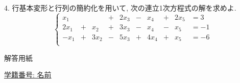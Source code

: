 \documentclass[dvipdfmx,a4paper,11pt]{article}
\theoremstyle{definition}
\begin{document}
4.
行基本変形と行列の簡約化を用いて, 次の連立1次方程式の解を求めよ.
 $$
 \left\{ 
\begin{matrix}
x_1& &         &  +& 2x_3&- &x_4&+ & 2x_5&= 3 \\
2x_1&+&x_2& + &3x_3&-&x_4&-&x_5&= -1 \\
-x_1&+&3x_2& - &5x_3&+&4x_4&+&x_5&= -6 \\
\end{matrix}
\right.
 $$
 
 \newpage
 \begin{center}
 {\Large 解答用紙}
\end{center}


\begin{flushleft}
{ \large \underline{学籍番号: \hspace{4cm} 名前  \hspace{9cm}   }  }
\end{flushleft}


 
\end{document}
